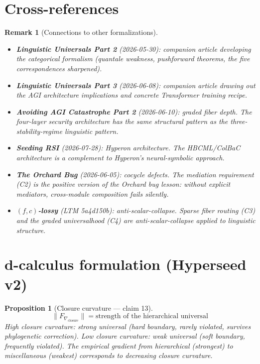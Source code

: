 \documentclass[11pt,a4paper]{article}
\newtheorem{proposition}[definition]{Proposition}
\newtheorem{remark}[definition]{Remark}
\begin{document}

\section{Cross-references}

\begin{remark}[Connections to other formalizations]
\begin{itemize}
\item \textbf{Linguistic Universals Part 2} (2026-05-30): companion
  article developing the categorical formalism (quantale weakness,
  pushforward theorems, the five correspondences sharpened).
\item \textbf{Linguistic Universals Part 3} (2026-06-08): companion
  article drawing out the AGI architecture implications and concrete
  Transformer training recipe.
\item \textbf{Avoiding AGI Catastrophe Part 2} (2026-06-10): graded
  fiber depth. The four-layer security architecture has the same
  structural pattern as the three-stability-regime linguistic pattern.
\item \textbf{Seeding RSI} (2026-07-28): Hyperon architecture. The
  HBCML/ColBaC architecture is a complement to Hyperon's
  neural-symbolic approach.
\item \textbf{The Orchard Bug} (2026-06-05): cocycle defects. The
  mediation requirement (C2) is the positive version of the Orchard
  bug lesson: without explicit mediators, cross-module composition
  fails silently.
\item \textbf{$(f,c)$-lossy} (LTM 5a4d150b): anti-scalar-collapse.
  Sparse fiber routing (C3) and the graded universalhood (C4) are
  anti-scalar-collapse applied to linguistic structure.
\end{itemize}
\end{remark}

\section{d-calculus formulation (Hyperseed v2)}

\begin{proposition}[Closure curvature --- claim 13]
\label{prop:closure}
\[
  \|F_{\nabla_{\text{closure}}}\| = \text{strength of the hierarchical
    universal}
\]
High closure curvature: strong universal (hard boundary, rarely violated,
survives phylogenetic correction). Low closure curvature: weak universal
(soft boundary, frequently violated). The empirical gradient from
hierarchical (strongest) to miscellaneous (weakest) corresponds to
decreasing closure curvature.
\end{proposition}
\end{document}
